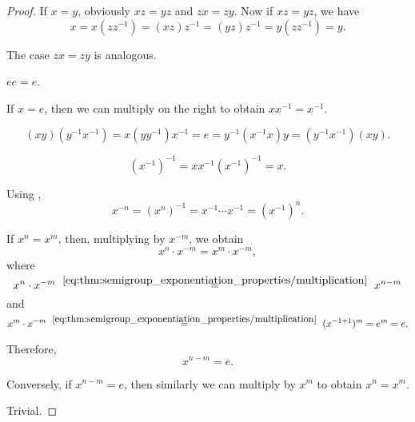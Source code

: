 \begin{proof}
   If \( x = y \), obviously \( xz = yz \) and \( zx = zy \). Now if \( xz = yz \), we have
  \begin{equation*}
    x = x(zz^{-1}) = (xz)z^{-1} = (yz)z^{-1} = y(zz^{-1}) = y.
  \end{equation*}

  The case \( zx = zy \) is analogous.

   \( ee = e \).

   If \( x = e \), then we can multiply on the right to obtain \( xx^{-1} = x^{-1} \).

  \begin{equation*}
    (xy) (y^{-1} x^{-1})
    =
    x (y y^{-1}) x^{-1}
    =
    e
    =
    y^{-1} (x^{-1} x) y
    =
    (y^{-1} x^{-1}) (xy).
  \end{equation*}

  \begin{equation*}
    (x^{-1})^{-1}
    =
    x x^{-1} (x^{-1})^{-1}
    =
    x.
  \end{equation*}

   Using ,
  \begin{equation*}
    x^{-n}
    =
    (x^n)^{-1}
    =
    x^{-1} \cdots x^{-1}
    =
    (x^{-1})^n.
  \end{equation*}

  \SufficiencySubProof* If \( x^n = x^m \), then, multiplying by \( x^{-m} \), we obtain
  \begin{equation*}
    x^n \cdot x^{-m}
    =
    x^m \cdot x^{-m},
  \end{equation*}
  where
  \begin{equation*}
    x^n \cdot x^{-m}
    \reloset {\eqref{eq:thm:semigroup_exponentiation_properties/multiplication}} =
    x^{n-m}
  \end{equation*}
  and
  \begin{equation*}
    x^m \cdot x^{-m}
    \reloset {\eqref{eq:thm:semigroup_exponentiation_properties/multiplication}} =
    (x^{-1 + 1})^m
    =
    e^m
    =
    e.
  \end{equation*}

  Therefore,
  \begin{equation*}
    x^{n-m} = e.
  \end{equation*}

  \NecessitySubProof* Conversely, if \( x^{n-m} = e \), then similarly we can multiply by \( x^m \) to obtain \( x^n = x^m \).

   Trivial.
\end{proof}

